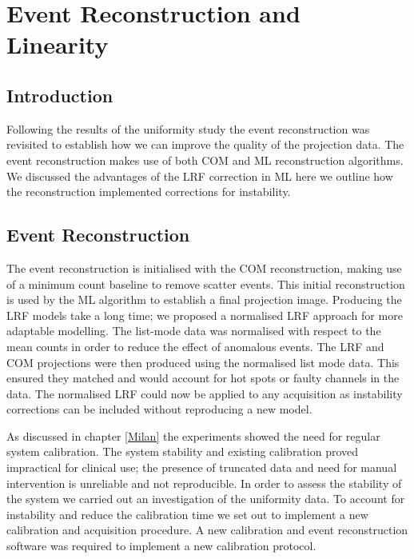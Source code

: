 \chapter{Event Reconstruction and Linearity}
\label{Linearity}

\section{Introduction}
Following the results of the uniformity study the event reconstruction was revisited to  establish how we can improve the quality of the projection data. The event reconstruction makes use of both \acrshort{COM} and \acrshort{ML} reconstruction algorithms. We discussed the advantages of the \acrshort{LRF} correction in \acrshort{ML} here we outline how the reconstruction implemented corrections for instability. 

\section{Event Reconstruction}
The event reconstruction is initialised with the \acrshort{COM} reconstruction, making use of a minimum count baseline to remove scatter events. This initial reconstruction is used by the \acrshort{ML} algorithm to establish a final projection image. Producing the \acrshort{LRF} models take a long time; we proposed a normalised \acrshort{LRF} approach for more adaptable modelling. The list-mode data was normalised with respect to the mean counts in order to reduce the effect of anomalous events. The \acrshort{LRF} and \acrshort{COM} projections were then produced using the normalised list mode data. This ensured they matched and would account for hot spots or faulty channels in the data. The normalised \acrshort{LRF} could now be applied to any acquisition as instability corrections can be included without reproducing a new model. 


As discussed in chapter \ref{Milan} the experiments showed the need for regular system calibration. The system stability and existing calibration proved impractical for clinical use; the presence of truncated data and need for manual intervention is unreliable and not reproducible. In order to assess the stability of the system we carried out an investigation of the uniformity data. To account for instability and reduce the calibration time we set out to implement a new calibration and acquisition procedure. A new calibration and event reconstruction software was required to implement a new calibration protocol.

